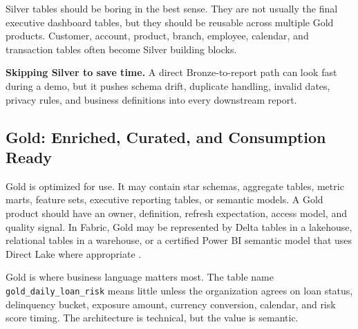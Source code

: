 Silver tables should be boring in the best sense. They are not usually the final executive dashboard tables, but they should be reusable across multiple Gold products. Customer, account, product, branch, employee, calendar, and transaction tables often become Silver building blocks.

\begin{pitfall}
\textbf{Skipping Silver to save time.} A direct Bronze-to-report path can look fast during a demo, but it pushes schema drift, duplicate handling, invalid dates, privacy rules, and business definitions into every downstream report.
\end{pitfall}

\subsection{Gold: Enriched, Curated, and Consumption Ready}
Gold is optimized for use. It may contain star schemas, aggregate tables, metric marts, feature sets, executive reporting tables, or semantic models. A Gold product should have an owner, definition, refresh expectation, access model, and quality signal. In Fabric, Gold may be represented by Delta tables in a lakehouse, relational tables in a warehouse, or a certified Power BI semantic model that uses Direct Lake where appropriate \cite{microsoftDirectLake}.

Gold is where business language matters most. The table name \texttt{gold\_daily\_loan\_risk} means little unless the organization agrees on loan status, delinquency bucket, exposure amount, currency conversion, calendar, and risk score timing. The architecture is technical, but the value is semantic.

